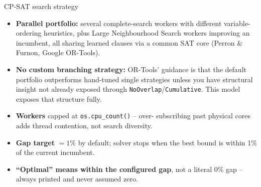 \documentclass[10pt,aspectratio=169]{beamer}
\newcommand{\bk}{\hfill\hyperlink{toc}{\beamerreturnbutton{Agenda}}}
\begin{document}
\begin{frame}{CP-SAT search strategy}
  \begin{itemize}\small
    \item \textbf{Parallel portfolio:} several complete-search workers with
      different variable-ordering heuristics, plus Large Neighbourhood Search
      workers improving an incumbent, all sharing learned clauses via a
      common SAT core (Perron \& Furnon, Google OR-Tools).
    \item \textbf{No custom branching strategy:} OR-Tools' guidance is that
      the default portfolio outperforms hand-tuned single strategies unless
      you have structural insight not already exposed through
      \texttt{NoOverlap}/\texttt{Cumulative}. This model exposes that
      structure fully.
    \item \textbf{Workers} capped at \texttt{os.cpu\_count()} -- over-
      subscribing past physical cores adds thread contention, not search
      diversity.
    \item \textbf{Gap target} $=1\%$ by default; solver stops when the
      best bound is within 1\% of the current incumbent.
    \item \textbf{``Optimal'' means within the configured gap}, not a
      literal 0\% gap -- always printed and never assumed zero.
  \end{itemize}
  \bk
\end{frame}
\end{document}
